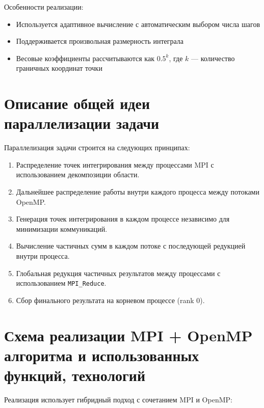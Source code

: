 \documentclass[a4paper,12pt]{article}
\begin{document}
Особенности реализации:
\begin{itemize}
    \item Используется адаптивное вычисление с автоматическим выбором числа шагов
    \item Поддерживается произвольная размерность интеграла
    \item Весовые коэффициенты рассчитываются как \(0.5^k\), где \(k\) — количество граничных координат точки
\end{itemize}

\section*{Описание общей идеи параллелизации задачи}
Параллелизация задачи строится на следующих принципах:
\begin{enumerate}
    \item Распределение точек интегрирования между процессами MPI с использованием декомпозиции области.
    \item Дальнейшее распределение работы внутри каждого процесса между потоками OpenMP.
    \item Генерация точек интегрирования в каждом процессе независимо для минимизации коммуникаций.
    \item Вычисление частичных сумм в каждом потоке с последующей редукцией внутри процесса.
    \item Глобальная редукция частичных результатов между процессами с использованием \texttt{MPI\_Reduce}.
    \item Сбор финального результата на корневом процессе (rank 0).
\end{enumerate}

\section*{Схема реализации MPI + OpenMP алгоритма и использованных функций, технологий}
Реализация использует гибридный подход с сочетанием MPI и OpenMP:
\end{document}
